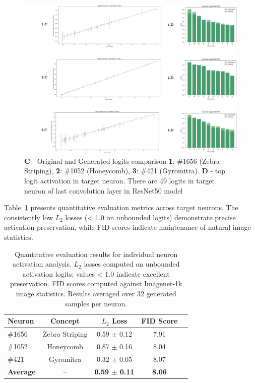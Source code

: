 \documentclass[licencjacka,en]{pracamgr}
\begin{document}
\begin{figure}[h]
\centering
\includegraphics[width=\linewidth]{figures/main/sae_results_2.png}
\caption{ \textbf{C} - Original and Generated logits comparison  \textbf{1}: \#1656 (Zebra Striping), \textbf{2}: \#1052 (Honeycomb), \textbf{3}: \#421 (Gyromitra). \textbf{D} - top logit activation in target neuron. There are 49 logits in target neuron of last convolution layer in ResNet50 model}
\label{fig:experiment_1_1}
\end{figure}

Table~\ref{tab:neuron_results} presents quantitative evaluation metrics across target neurons. The consistently low $L_2$ losses (< 1.0 on unbounded logits) demonstrate precise activation preservation, while FID scores indicate maintenance of natural image statistics.

\begin{table}[h!]
\centering
\begin{tabular}{lcccc}
\toprule
\textbf{Neuron} & \textbf{Concept} & \textbf{$L_2$ Loss} & \textbf{FID Score}\\
\midrule
\#1656 & Zebra Striping & 0.59 $\pm$ 0.12 & 7.91 \\
\#1052 & Honeycomb & 0.87 $\pm$ 0.16 & 8.04\\
\#421 & Gyromitra & 0.32 $\pm$ 0.05 & 8.07\\
\midrule
\textbf{Average} & -- & \textbf{0.59 $\pm$ 0.11} & \textbf{8.06}  \\
\bottomrule
\end{tabular}
\caption{Quantitative evaluation results for individual neuron activation analysis. $L_2$ losses computed on unbounded activation logits; values < 1.0 indicate excellent preservation. FID scores computed against Imagenet-1k  image statistics. Results averaged over 32 generated samples per neuron.}
\label{tab:neuron_results}
\end{table}
\end{document}
